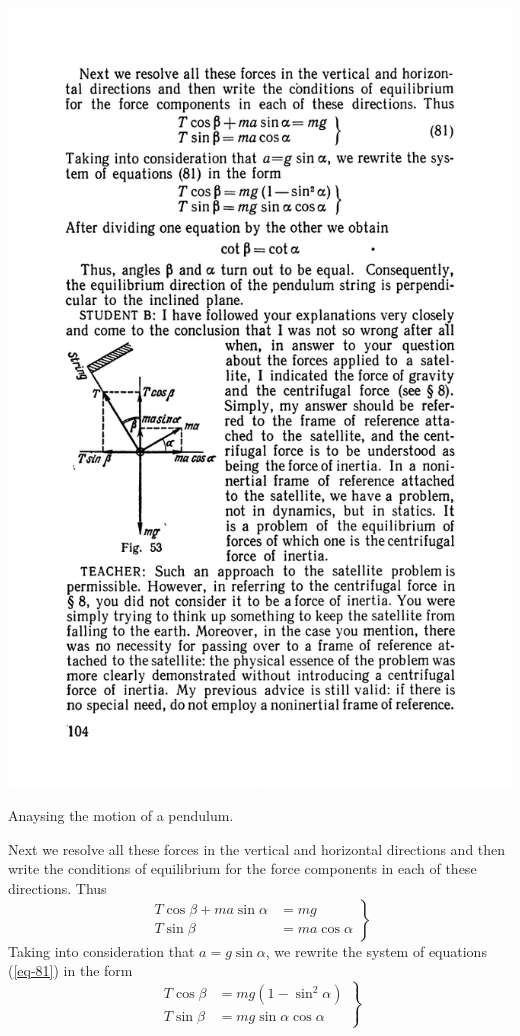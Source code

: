 \documentclass[a4paper,sfsidenotes]{tufte-book}
\begin{document}
\begin{marginfigure}
\centering
\includegraphics[width=\linewidth]{fig-053a.pdf}
\caption{Anaysing the motion of a pendulum.}
\label{fig-53}
\end{marginfigure}

Next we resolve all these forces in the vertical and horizontal directions and then write the conditions of equilibrium for the force components in each of these directions. Thus
\\
\begin{equation}
\left.
\begin{split}
T \cos \beta +ma \sin \alpha & =mg \\
T \sin \beta & = ma \cos \alpha	
\end{split}
\right\}
\label{eq-81}
\end{equation}
Taking into consideration that $a=g \sin \alpha$, we rewrite the system of equations (\ref{eq-81}) in the form
\\
\begin{equation*}
\left.
\begin{split}
T \cos \beta & = mg (1 - \sin^{2} \alpha) \\
T \sin \beta & = mg \sin \alpha \cos \alpha
\end{split}
\right\}
\end{equation*}
\end{document}
